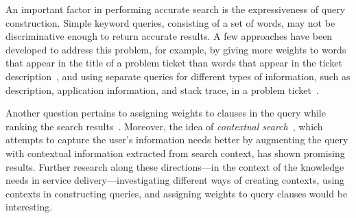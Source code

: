 
An important factor in performing accurate search is the expressiveness of query
construction. Simple keyword queries, consisting of a set of words, may not be
discriminative enough to return accurate results. A few approaches have been
developed to address this problem, for example, by giving more weights to words
that appear in the title of a problem ticket than words that appear in the
ticket description~\cite{Sinha:2012}, and using separate queries for different
types of information, such as description, application information, and stack
trace, in a problem ticket~\cite{Ashok:2009}.

Another question pertains to assigning weights to clauses in the query while
ranking the search results~\cite{Debdoot:2011:bpm}. Moreover, the idea
of \textit{contextual search}~\cite{wen2004probabilistic,kraft2005q}, which
attempts to capture the user's information needs better by augmenting the query
with contextual information extracted from search context, has shown promising
results. Further research along these directions---in the context of the
knowledge needs in service delivery---investigating different ways of creating
contexts, using contexts in constructing queries, and assigning weights to query
clauses would be interesting.

